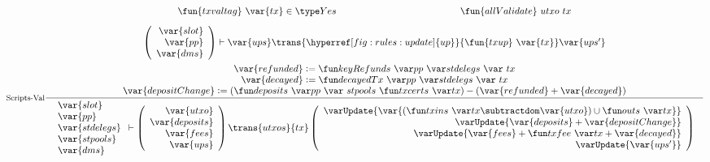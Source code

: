 \begin{figure}[htb]
  \begin{equation}
    \inference[Scripts-Val]
    {
    \fun{txvaltag}~\var{tx} \in \Yes  &
    \fun{allValidate}~{utxo}~{tx}
    \\
    ~
    \\
    {
      \left(
        \begin{array}{r}
          \var{slot} \\
          \var{pp} \\
          \var{dms} \\
        \end{array}
      \right)
    }
    \vdash \var{ups} \trans{\hyperref[fig:rules:update]{up}}{\fun{txup}~\var{tx}} \var{ups'}
    \\~\\
    \var{refunded} \leteq \keyRefunds{pp}{stdelegs}~{tx}
    \\
    \var{decayed} \leteq \decayedTx{pp}{stdelegs}~{tx}
    \\
    \var{depositChange} \leteq
      (\deposits{pp}~{stpools}~{\txcerts{tx}}) - (\var{refunded} + \var{decayed})
    }
    {
    \begin{array}{l}
      \var{slot}\\
      \var{pp}\\
      \var{stdelegs}\\
      \var{stpools}\\
      \var{dms}\\
    \end{array}
      \vdash
      \left(
      \begin{array}{r}
        \var{utxo} \\
        \var{deposits} \\
        \var{fees} \\
        \var{ups} \\
      \end{array}
      \right)
      \trans{utxos}{tx}
      \left(
      \begin{array}{r}
        \varUpdate{\var{(\txins{tx} \subtractdom \var{utxo}) \cup \outs{tx}}}  \\
        \varUpdate{\var{deposits} + \var{depositChange}} \\
        \varUpdate{\var{fees} + \txfee{tx} + \var{decayed}} \\
        \varUpdate{\var{ups'}} \\
      \end{array}
      \right) \\
}
\end{equation}
\end{figure}
